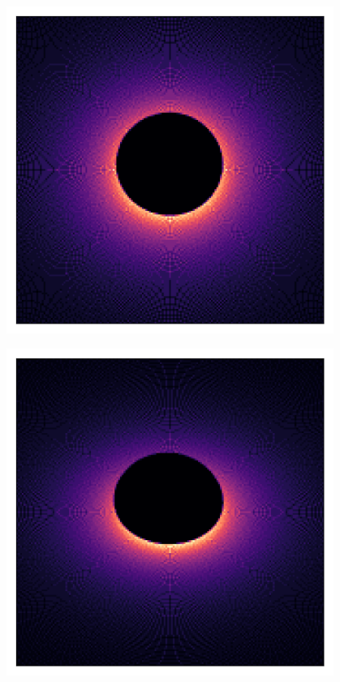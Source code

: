 \documentclass{beamer}
\begin{document}
\begin{frame}{}
    \centering

    \includegraphics[width=0.8\textwidth]{asset/bh_0.5_20.png}

\end{frame}


\begin{frame}{}
    \centering

    \includegraphics[width=0.8\textwidth]{asset/bh_0.5_45.png}

\end{frame}
\end{document}
